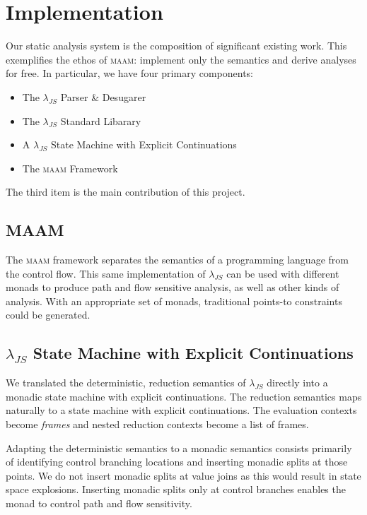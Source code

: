 \documentclass[10pt,letter,english]{article}
\newcommand{\maam}[0]{\textsc{maam}}
\newcommand{\lambdajs}[0]{$\lambda_{JS}$}
\begin{document}
\section{Implementation}

Our static analysis system is the composition of significant existing work. This
exemplifies the ethos of \maam{}: implement only the semantics and derive
analyses for free. In particular, we have four primary components:

\begin{itemize}
\item The \lambdajs{} Parser \& Desugarer
\item The \lambdajs{} Standard Libarary
\item A \lambdajs{} State Machine with Explicit Continuations
\item The \maam{} Framework
\end{itemize}

The third item is the main contribution of this project.

\subsection{MAAM}

The \maam{} framework separates the semantics of a programming language from the
control flow. This same implementation of \lambdajs{} can be used with different
monads to produce path and flow sensitive analysis, as well as other kinds of
analysis. With an appropriate set of monads, traditional points-to constraints
could be generated.

\subsection{\lambdajs{} State Machine with Explicit Continuations}

We translated the deterministic, reduction semantics of \lambdajs{} directly
into a monadic state machine with explicit continuations. The reduction
semantics maps naturally to a state machine with explicit continuations. The
evaluation contexts become \emph{frames} and nested reduction contexts become a
list of frames.

Adapting the deterministic semantics to a monadic semantics consists primarily
of identifying control branching locations and inserting monadic splits at those
points. We do not insert monadic splits at value joins as this would result in
state space explosions. Inserting monadic splits only at control branches
enables the monad to control path and flow sensitivity.
\end{document}
